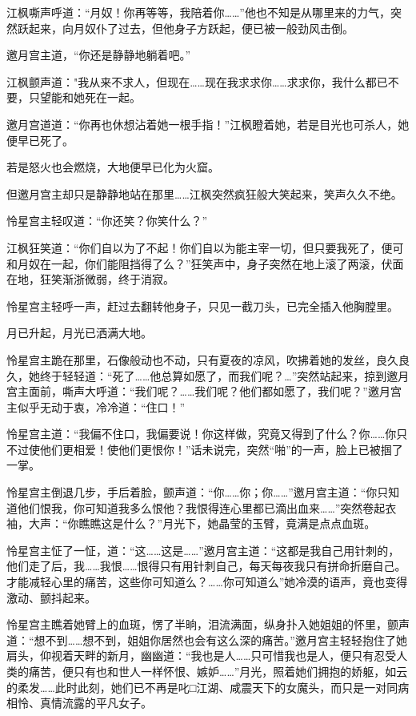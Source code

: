 \documentclass[12pt,oneside]{book}
\begin{document}
江枫嘶声呼道：``月奴！你再等等，我陪着你\ldots\ldots{}''他也不知是从哪里来的力气，突然跃起来，向月奴仆了过去，但他身子方跃起，便已被一般劲风击倒。

邀月宫主道，``你还是静静地躺着吧。''

江枫颤声道："我从来不求人，但现在\ldots\ldots 现在我求求你\ldots\ldots 求求你，我什么都已不要，只望能和她死在一起。

邀月宫道道：``你再也休想沾着她一根手指！''江枫瞪着她，若是目光也可杀人，她便早已死了。

若是怒火也会燃烧，大地便早已化为火窟。

但邀月宫主却只是静静地站在那里\ldots\ldots 江枫突然疯狂般大笑起来，笑声久久不绝。

怜星宫主轻叹道：``你还笑？你笑什么？''

江枫狂笑道：``你们自以为了不起！你们自以为能主宰一切，但只要我死了，便可和月奴在一起，你们能阻挡得了么？''狂笑声中，身子突然在地上滚了两滚，伏面在地，狂笑渐浙微弱，终于消寂。

怜星宫主轻呼一声，赶过去翻转他身子，只见一截刀头，已完全插入他胸膛里。

月已升起，月光已洒满大地。

怜星宫主跪在那里，石像般动也不动，只有夏夜的凉风，吹拂着她的发丝，良久良久，她终于轻轻道：``死了\ldots\ldots 他总算如愿了，而我们呢？\ldots{}''突然站起来，掠到邀月宫主面前，嘶声大呼道：``我们呢？\ldots\ldots 我们呢？他们都如愿了，我们呢？''邀月宫主似乎无动于衷，冷冷道：``住口！''

怜星宫主道：``我偏不住口，我偏要说！你这样做，究竟又得到了什么？你\ldots\ldots 你只不过使他们更相爱！使他们更恨你！''话未说完，突然``啪''的一声，脸上已被掴了一掌。

怜星宫主倒退几步，手后着脸，颤声道：``你\ldots\ldots 你；你\ldots\ldots{}''邀月宫主道：``你只知道他们恨我，你可知道我多么恨他？我恨得连心里都已滴出血来\ldots\ldots{}''突然卷起衣袖，大声：``你瞧瞧这是什么？''月光下，她晶莹的玉臂，竟满是点点血斑。

怜星宫主怔了一怔，道：``这\ldots\ldots 这是\ldots\ldots{}''邀月宫主道：``这都是我自己用针刺的，他们走了后，我\ldots\ldots 我恨\ldots\ldots 恨得只有用针刺自己，每天每夜我只有拼命折磨自己。才能减轻心里的痛苦，这些你可知道么？\ldots\ldots 你可知道么''她冷漠的语声，竟也变得激动、颤抖起来。

怜星宫主瞧着她臂上的血斑，愣了半晌，泪流满面，纵身扑入她姐姐的怀里，颤声道：``想不到\ldots\ldots 想不到，姐姐你居然也会有这么深的痛苦。''邀月宫主轻轻抱住了她肩头，仰视着天畔的新月，幽幽道：``我也是人\ldots\ldots 只可惜我也是人，便只有忍受人类的痛苦，便只有也和世人一样怀恨、嫉妒\ldots\ldots{}''月光，照着她们拥抱的娇躯，如云的柔发\ldots\ldots 此时此刻，她们已不再是叱□江湖、咸震天下的女魔头，而只是一对同病相怜、真情流露的平凡女子。
\end{document}
